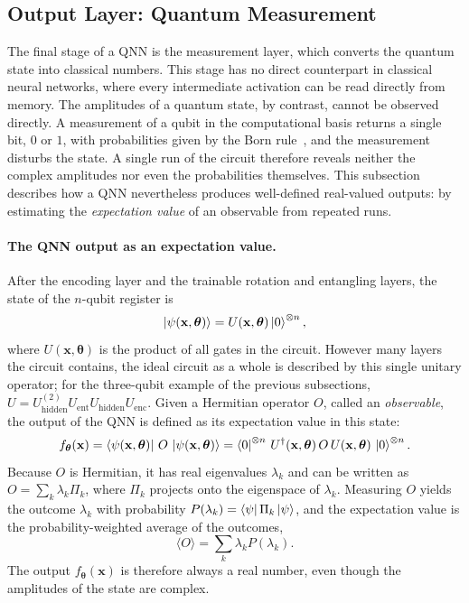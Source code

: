 \documentclass[12pt]{article}
\numberwithin{equation}{section}  %
\begin{document}
\subsection{Output Layer: Quantum Measurement}
\label{sec:measurement}

The final stage of a QNN is the measurement layer, which converts the quantum state into classical numbers. This stage has no direct counterpart in classical neural networks, where every intermediate activation can be read directly from memory. The amplitudes of a quantum state, by contrast, cannot be observed directly. A measurement of a qubit in the computational basis returns a single bit, $0$ or $1$, with probabilities given by the Born rule~\cite[Sec.~2.2]{nielsen2010quantum}, and the measurement disturbs the state. A single run of the circuit therefore reveals neither the complex amplitudes nor even the probabilities themselves. This subsection describes how a QNN nevertheless produces well-defined real-valued outputs: by estimating the \emph{expectation value} of an observable from repeated runs.

\paragraph{The QNN output as an expectation value.} After the encoding layer and the trainable rotation and entangling layers, the state of the $n$-qubit register is
\begin{equation}
\ket{\psi(\mathbf{x}, \boldsymbol{\theta})} = U(\mathbf{x}, \boldsymbol{\theta}) \ket{0}^{\otimes n},
\label{eq:final_state}
\end{equation}
where $U(\mathbf{x}, \boldsymbol{\theta})$ is the product of all gates in the circuit. However many layers the circuit contains, the ideal circuit as a whole is described by this single unitary operator; for the three-qubit example of the previous subsections, $U = U_{\mathrm{hidden}}^{(2)} U_{\mathrm{ent}} U_{\mathrm{hidden}} U_{\mathrm{enc}}$. Given a Hermitian operator $O$, called an \emph{observable}, the output of the QNN is defined as its expectation value in this state:
\begin{equation}
f_{\boldsymbol{\theta}}(\mathbf{x})
= \bra{\psi(\mathbf{x}, \boldsymbol{\theta})}\, O\, \ket{\psi(\mathbf{x}, \boldsymbol{\theta})}
= \bra{0}^{\otimes n}\, U^{\dagger}(\mathbf{x}, \boldsymbol{\theta})\, O\, U(\mathbf{x}, \boldsymbol{\theta})\, \ket{0}^{\otimes n}.
\label{eq:qnn_output}
\end{equation}
Because $O$ is Hermitian, it has real eigenvalues $\lambda_k$ and can be written as $O = \sum_k \lambda_k \Pi_k$, where $\Pi_k$ projects onto the eigenspace of $\lambda_k$. Measuring $O$ yields the outcome $\lambda_k$ with probability $P(\lambda_k) = \bra{\psi}\Pi_k\ket{\psi}$, and the expectation value is the probability-weighted average of the outcomes,
\begin{equation}
\langle O \rangle = \sum_k \lambda_k P(\lambda_k).
\end{equation}
The output $f_{\boldsymbol{\theta}}(\mathbf{x})$ is therefore always a real number, even though the amplitudes of the state are complex.
\end{document}
